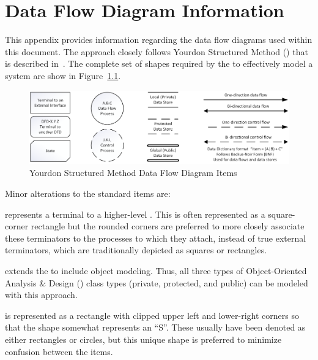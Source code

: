 
\chapter{Data Flow Diagram Information}
\label{loc:DFD_Information}

This appendix provides information regarding the data flow diagrams used within this document.
The \DFD approach closely follows Yourdon Structured Method (\YSM) that is described in~\citeJESA.
The complete set of shapes required by the \YSM to effectively model a system are show in Figure~\ref{fig:YSM-DFD}.
\begin{figure}[htbp]
	\centering
			\includegraphics[width=6.5in]{images/YSM_DFD_Shapes_Image.pdf}%
		\caption{Yourdon Structured Method Data Flow Diagram Items}
	\label{fig:YSM-DFD}
\end{figure}
Minor alterations to the \YSM standard items are:
\begin{description}[itemindent=5pt,topsep=0pt,itemsep=0pt,partopsep=0pt, parsep=0pt]
	\item [Rounded Rectangle] represents a terminal to a higher-level \DFD. This is often represented as a square-corner rectangle but the rounded corners are preferred to more closely associate these terminators to the processes to which they attach, instead of true external terminators, which are traditionally depicted as squares or rectangles.
	\item [Protected Data Store] extends the \YSM to include object modeling. Thus, all three types of Object-Oriented Analysis \& Design (\OOAD) class types (private, protected, and public) can be modeled with this \YSM approach.
	\item [State] is represented as a rectangle with clipped upper left and lower-right corners so that the shape somewhat represents an ``S''. These usually have been denoted as either rectangles or circles, but this unique shape is preferred to minimize confusion between the \YSM \DFD items.
\end{description}

